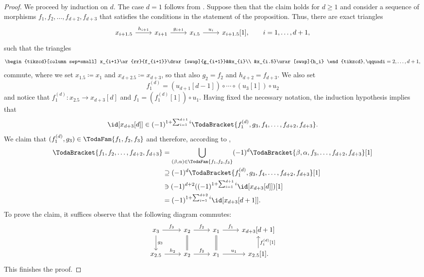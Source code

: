 \documentclass[a4paper]{amsart}
\begin{document}
\begin{proof}
  We proceed by induction on $d$. The case $d=1$ follows from
  . Suppose then that the claim holds for
  $d\geq1$ and consider a sequence of morphisms $f_1,f_2,\dots,f_{d+2},f_{d+3}$
  that satisfies the conditions in the statement of the proposition. Thus, there
  are exact triangles
  \[
    \begin{tikzcd}
      x_{i+1.5}\rar{h_{i+1}}&x_{i+1}\rar{g_{i+1}}&x_{i.5}\rar{u_{i}}&x_{i+1.5}[1],\qquad{i=1,\dots,d+1},
    \end{tikzcd}
  \]
  such that the triangles
  \[
    \begin{tikzcd}[column sep=small]
      x_{i+1}\ar{rr}{f_{i+1}}\drar[swap]{g_{i+1}}&&x_{i}\\
      &x_{i.5}\urar[swap]{h_i}
    \end{tikzcd},\qquad%
    i=2,\dots,d+1,
  \]
  commute, where we set $x_{1.5}\coloneqq x_1$ and $x_{d+2.5}\coloneqq x_{d+3}$,
  so that also $g_2=f_2$ and $h_{d+2}=f_{d+3}$. We also set
  \[
    f_1^{(d)}=(u_{d+1}[d-1])\circ\cdots\circ(u_3[1])\circ u_2
  \]
  and notice that $f_1^{(d)}\colon x_{2.5}\to x_{d+3}[d]$ and
  $f_1=(f_1^{(d)}[1])\circ u_1$. Having fixed the necessary notation, the
  induction hypothesis implies that
  \[
    \id[x_{d+3}[d]]\in(-1)^{1+\sum_{i=1}^{d+1}i}\TodaBracket{f_1^{(d)},g_3,f_4,\dots,f_{d+2},f_{d+3}}.
  \]
  We claim that $(f_1^{(d)},g_3)\in\TodaFam{f_1,f_2,f_3}$ and therefore,
  according to ,
  \begin{align*}
    \TodaBracket{f_1,f_2,\dots,f_{d+2},f_{d+3}}&=\bigcup_{(\beta,\alpha)\in\TodaFam{f_1,f_2,f_3}}(-1)^d\TodaBracket{\beta,\alpha,f_3,\dots,f_{d+2},f_{d+3}}[1] \\
                                                &\supseteq(-1)^{d}\TodaBracket{f_1^{(d)},g_3,f_4,\dots,f_{d+2},f_{d+3}}[1]                                      \\
                                                &\ni(-1)^{d+2}((-1)^{1+\sum_{i=1}^{d+1}i}\id[x_{d+3}[d]])[1]                                                    \\
                                                &=(-1)^{1+\sum_{i=1}^{d+2}i}\id[x_{d+3}[d+1]].
  \end{align*}
  To prove the claim, it suffices observe that the following diagram commutes:
  \[
    \begin{tikzcd}
      x_3\rar{f_3}\dar{g_3}&x_2\rar{f_2}\dar[equals]&x_1\rar{f_1}\dar[equals]&x_{d+3}[d+1]\\
      x_{2.5}\rar{h_2}&x_2\rar{f_2}&x_1\rar{u_1}&x_{2.5}[1]\uar[swap]{f_1^{(d)}[1]}.
    \end{tikzcd}
  \]
  This finishes the proof.
\end{proof}
\end{document}
